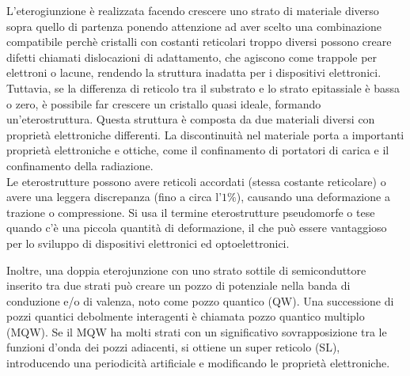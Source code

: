 %
L'eterogiunzione è realizzata facendo crescere uno strato di materiale diverso sopra quello di partenza ponendo attenzione ad aver scelto una combinazione compatibile  perchè cristalli con costanti reticolari troppo diversi possono creare difetti chiamati dislocazioni di adattamento, che agiscono come trappole per elettroni o lacune, rendendo la struttura inadatta per i dispositivi elettronici.
Tuttavia, se la differenza di reticolo tra il substrato e lo strato epitassiale è bassa o zero, è possibile far crescere un cristallo quasi ideale, formando un'eterostruttura. Questa struttura è composta da due materiali diversi con proprietà elettroniche differenti. La discontinuità nel materiale porta a importanti proprietà elettroniche e ottiche, come il confinamento di portatori di carica e il confinamento della radiazione.\\

Le eterostrutture possono avere reticoli accordati (stessa costante reticolare) o avere una leggera discrepanza (fino a circa l'$1\%$), causando una deformazione a trazione o compressione. Si usa il termine eterostrutture pseudomorfe o tese quando c'è una piccola quantità di deformazione, il che può essere vantaggioso per lo sviluppo di dispositivi elettronici ed optoelettronici.

Inoltre, una doppia eterojunzione con uno strato sottile di semiconduttore inserito tra due strati può creare un pozzo di potenziale nella banda di conduzione e/o di valenza, noto come pozzo quantico (QW). Una successione di pozzi quantici debolmente interagenti è chiamata pozzo quantico multiplo (MQW). Se il MQW ha molti strati con un significativo sovrapposizione tra le funzioni d'onda dei pozzi adiacenti, si ottiene un super reticolo (SL), introducendo una periodicità artificiale e modificando le proprietà elettroniche.

